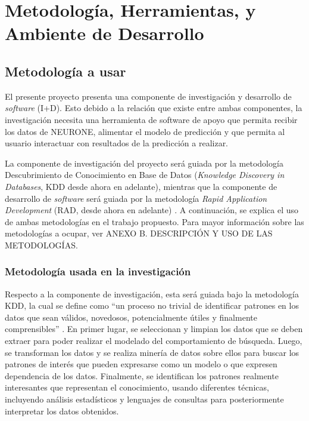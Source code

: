 \chapter{Metodología, Herramientas, y Ambiente de Desarrollo}
\label{chp:metodologia-herramientas-ambiente}

\section{Metodología a usar}
\label{sec:metodologia}
El presente proyecto presenta una componente de investigación y desarrollo de \textit{software} (I+D). Esto debido a la relación que existe entre ambas componentes, la investigación necesita una herramienta de software de apoyo que permita recibir los datos de NEURONE, alimentar el modelo de predicción y que permita al usuario interactuar con resultados de la predicción a realizar.

La componente de investigación del proyecto será guiada por la metodología Descubrimiento de Conocimiento en Base de Datos (\textit{Knowledge Discovery in Databases}, KDD desde ahora en adelante), mientras que la componente de desarrollo de \textit{software} será guiada por la metodología \textit{Rapid Application Development} (RAD, desde ahora en adelante) \cite{martin1991rapid}. A continuación, se explica el uso de ambas metodologías en el trabajo propuesto. Para mayor información sobre las metodologías a ocupar, ver ANEXO B. DESCRIPCIÓN Y USO DE LAS METODOLOGÍAS.

\subsection{Metodología usada en la investigación}
\label{sub:metodologia-investigacion}
Respecto a la componente de investigación, esta será guiada bajo la metodología KDD, la cual se define como “un proceso no trivial de identificar patrones en los datos que sean válidos, novedosos, potencialmente útiles y finalmente comprensibles” \cite{fayyad1996data}. En primer lugar, se seleccionan y limpian los datos que se deben extraer para poder realizar el modelado del comportamiento de búsqueda. Luego, se transforman los datos y se realiza minería de datos sobre ellos para buscar los patrones de interés que pueden expresarse como un modelo o que expresen dependencia de los datos. Finalmente, se identifican los patrones realmente interesantes que representan el conocimiento, usando diferentes técnicas, incluyendo análisis estadísticos y lenguajes de consultas para posteriormente interpretar los datos obtenidos.

